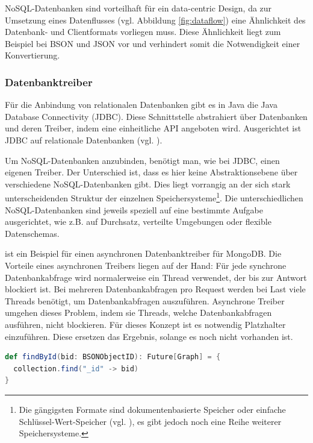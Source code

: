NoSQL-Datenbanken sind vorteilhaft für ein data-centric Design, da zur Umsetzung eines Datenflusses (vgl. Abbildung \ref{fig:dataflow}) eine Ähnlichkeit des Datenbank- und Clientformats vorliegen muss. Diese Ähnlichkeit liegt zum Beispiel bei BSON und JSON vor und verhindert somit die Notwendigkeit einer Konvertierung.

\subsubsection{Datenbanktreiber}
\label{sec:reactive}
Für die Anbindung von relationalen Datenbanken gibt es in Java die Java Database Connectivity (JDBC). Diese Schnittstelle abstrahiert über Datenbanken und deren Treiber, indem eine einheitliche API angeboten wird. Ausgerichtet ist JDBC auf relationale Datenbanken (vgl. \cite{reese2000database}).

Um NoSQL-Datenbanken anzubinden, benötigt man, wie bei JDBC, einen eigenen Treiber. Der Unterschied ist, dass es hier keine Abstraktionsebene über verschiedene NoSQL-Datenbanken gibt. Dies liegt vorrangig an der sich stark unterscheidenden Struktur der einzelnen Speichersysteme\footnote{Die gängigsten Formate sind dokumentenbasierte Speicher oder einfache Schlüssel-Wert-Speicher (vgl. \cite{nosql-databases}), es gibt jedoch noch eine Reihe weiterer Speichersysteme.}. Die unterschiedlichen NoSQL-Datenbanken sind jeweils speziell auf eine bestimmte Aufgabe ausgerichtet, wie z.B. auf Durchsatz, verteilte Umgebungen oder flexible Datenschemas. 

 ist ein Beispiel für einen asynchronen Datenbanktreiber für MongoDB. Die Vorteile eines asynchronen Treibers liegen auf der Hand: Für jede synchrone Datenbankabfrage wird normalerweise ein Thread verwendet, der bis zur Antwort blockiert ist. Bei mehreren Datenbankabfragen pro Request werden bei Last viele Threads benötigt, um Datenbankabfragen auszuführen. Asynchrone Treiber umgehen dieses Problem, indem sie Threads, welche Datenbankabfragen ausführen, nicht blockieren. Für dieses Konzept ist es notwendig Platzhalter einzuführen. Diese ersetzen das Ergebnis, solange es noch nicht vorhanden ist.

\begin{lstlisting}[label=lst:asyncaccess, caption=Funktionssignatur für asynchronen Datenbankzugriff, language=scala]
def findById(bid: BSONObjectID): Future[Graph] = {
  collection.find("_id" -> bid)
}
\end{lstlisting}
 
